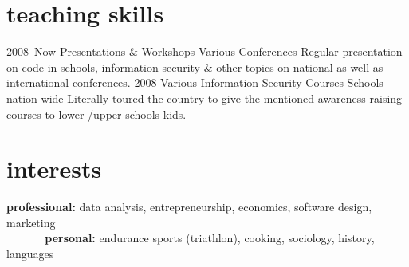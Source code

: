 \documentclass[]{friggeri-cv} %
\begin{document}

\section{teaching skills}

\begin{entrylist}
\entry
{2008--Now}
{Presentations \& Workshops}
{Various Conferences}
{Regular presentation on code in schools, information security \& other topics on national as well as international conferences.}
\entry
{2008}
{Various Information Security Courses}
{Schools nation-wide}
{Literally toured the country to give the mentioned awareness raising courses to lower-/upper-schools kids.}
\end{entrylist}


\section{interests}

\textbf{professional:} data analysis, entrepreneurship, economics, software design, marketing \\
\textbf{\ \ \ \ \ \ personal:} endurance sports (triathlon), cooking, sociology, history, languages




\end{document}
